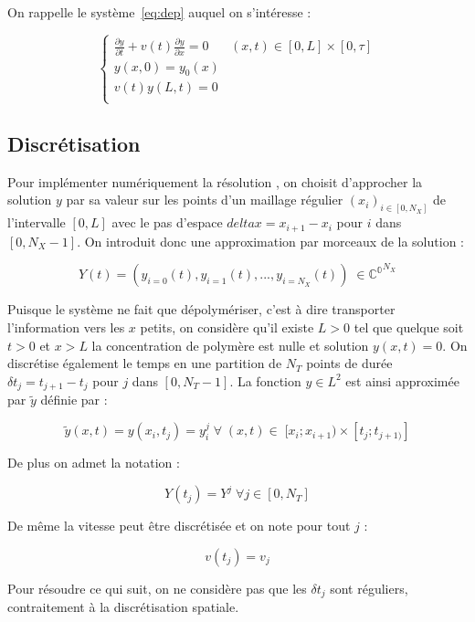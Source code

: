 \documentclass[a4paper]{article}
\begin{document}
On rappelle le système~\eqref{eq:dep} auquel on s'intéresse :

\[
\begin{cases}
		\displaystyle \frac{\partial y}{\partial t}+ v(t) \frac{\partial y} {\partial x}  = 0 & (x,t) \in [0,L] \times [0, \tau] \\
        y(x,0) = y_{0} (x) \\
	    v(t)y(L,t) = 0 \\
\end{cases}
\]

\subsection{Discrétisation}

Pour implémenter numériquement la résolution , on choisit d'approcher la solution $y$ par sa valeur sur les points d'un maillage régulier $(x_i)_{i \in [0,N_X]}$ de l'intervalle $[0,L]$ avec le pas d'espace $ delta x = x_{i+1} - x_i$ pour $i$ dans $[0,N_X-1]$. On introduit donc une approximation par morceaux de la solution :

\[ Y(t) = (y_{i=0}(t), y_{i=1}(t),...,y_{i=N_X}(t)) \; \in \mathbb{C^0}^{N_X}\]

Puisque le système ne fait que dépolymériser, c'est à dire transporter l'information vers les $x$ petits, on considère qu'il existe $L>0$ tel que quelque soit $t>0$ et $x>L$ la concentration de polymère est nulle et solution $y(x,t)=0$. On discrétise également le temps en une partition de $N_T$ points de durée $\delta t_j = t_{j+1} - t_j$ pour $j$ dans $[0,N_T-1]$. La fonction $y \in L^2$ est ainsi approximée par $\tilde{y}$ définie par :

\[ \tilde{y} (x,t) = y(x_i,t_j)=y_i^j \; \forall \; (x,t) \in \; [x_i;x_{i+1}) \times [t_j;t_{j+1)}]\]

De plus on admet la notation :

\[Y(t_j) = Y^j \; \forall j \in [0,N_T] \]

De même la vitesse peut être discrétisée et on note pour tout $j$ :

\[ v(t_j) = v_j \]

Pour résoudre ce qui suit, on ne considère pas que les $\delta t_j$ sont réguliers, contraitement à la discrétisation spatiale.
\end{document}
